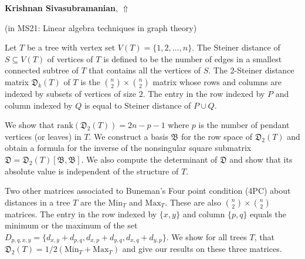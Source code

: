 \documentclass[ILAS2025-program.tex]{subfiles}
\begin{document}
\hypertarget{down0337}{}\begin{ilasabstract}
    
\textbf{Krishnan Sivasubramanian},  \hfill \hyperlink{up0337}{$\Uparrow$}
    
    
(in {\color{mstitle}MS21: Linear algebra techniques in graph theory})
        
\mtskip
    Let $T$ be a tree with vertex set $V(T)=\{1,2,\ldots,n\}$. 
The Steiner distance of $S\subseteq V(T)$ of vertices
of $T$ is defined to be the number of edges in a smallest 
connected subtree of $T$ that contains all the vertices of $S$. 
The 2-Steiner distance matrix ${\mathfrak{D}}_k(T)$ of $T$ is the 
$\binom{n}{2}\times \binom{n}{2}$ matrix whose rows 
and columns are indexed by subsets of vertices of size $2$.
The entry in the row indexed by $P$ and column indexed 
by $Q$ is equal to Steiner distance of $P \cup Q$. 


We show that ${\mathrm{rank}}({\mathfrak{D}}_2(T)) = 2n -p - 1$ 
where $p$ is the number of pendant vertices (or leaves) in $T$.
We construct a basis ${\mathfrak{B}}$ for the row space of ${\mathfrak{D}}_2(T)$ and obtain 
a formula for the inverse of the nonsingular square submatrix 
${\mathfrak{D}}={\mathfrak{D}}_2(T)[{\mathfrak{B}},{\mathfrak{B}}]$.  We also compute the determinant of 
${\mathfrak{D}}$ and show that its absolute value is independent of the 
structure of $T$. %

Two other matrices associated to Buneman's 
Four point condition (4PC) about distances in a tree $T$ 
are the ${\mathrm{Min}}_T$ and ${\mathrm{Max}}_T$.  These are also $\binom{n}{2} 
\times \binom{n}{2}$ matrices.  The entry in the row
indexed by $\{x,y\}$ and column $\{p,q\}$ equals the 
minimum or the maximum of the set $D_{p,q,x,y} = \{d_{x,y} + d_{p,q},
d_{x,p} + d_{y,q}, d_{x,q} + d_{y,p} \}$.  We show for 
all trees $T$, that
${\mathfrak{D}}_2(T) = 1/2({\mathrm{Min}}_T + {\mathrm{Max}}_T)$ and give our results on these three 
matrices.
\end{ilasabstract}
    
\end{document}
